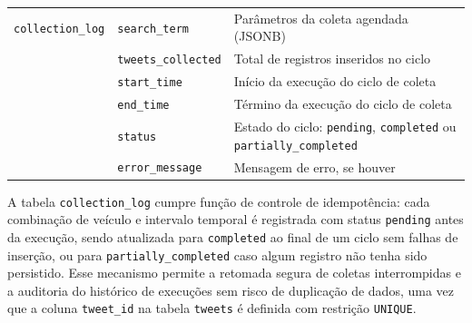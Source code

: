 \begin{table}[!htb]
\begin{tabular}{p{4.5cm}p{4.5cm}p{5.8cm}}
		\hline
		\texttt{collection\_log} & \texttt{search\_term} & Parâmetros da coleta agendada (JSONB) \\ & \texttt{tweets\_collected}    & Total de registros inseridos no 	ciclo \\
		& \texttt{start\_time} & Início da execução do ciclo de coleta \\ & \texttt{end\_time} & Término da execução do ciclo de coleta \\ 	& \texttt{status} & Estado do ciclo: \texttt{pending}, 		\texttt{completed} ou \texttt{partially\_completed} \\ & \texttt{error\_message} & Mensagem de erro, se houver \\
		\hline
	\end{tabular}
\end{table}

A tabela \texttt{collection\_log} cumpre função de controle de idempotência: cada combinação de veículo e intervalo temporal é registrada com status \texttt{pending} antes da execução, sendo
atualizada para \texttt{completed} ao final de um ciclo sem falhas de inserção, ou para \texttt{partially\_completed} caso algum registro não tenha sido persistido. Esse mecanismo permite a retomada segura de coletas interrompidas e a auditoria do histórico de execuções sem risco de duplicação de dados, uma vez que a coluna \texttt{tweet\_id} na tabela \texttt{tweets} é definida com restrição \texttt{UNIQUE}.
